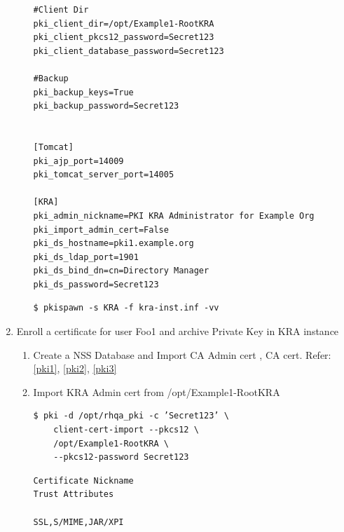 \documentclass[a4paper]{article}
\begin{document}
\begin{enumerate}[label*=\arabic*.]
\begin{enumerate}[label*=\arabic*.]
\begin{lstlisting}[style=configFile]
#Client Dir
pki_client_dir=/opt/Example1-RootKRA
pki_client_pkcs12_password=Secret123
pki_client_database_password=Secret123

#Backup
pki_backup_keys=True
pki_backup_password=Secret123


[Tomcat]
pki_ajp_port=14009
pki_tomcat_server_port=14005

[KRA]
pki_admin_nickname=PKI KRA Administrator for Example Org
pki_import_admin_cert=False
pki_ds_hostname=pki1.example.org
pki_ds_ldap_port=1901
pki_ds_bind_dn=cn=Directory Manager
pki_ds_password=Secret123
                \end{lstlisting}
                \begin{lstlisting}[style=bashInputStyle]
$ pkispawn -s KRA -f kra-inst.inf -vv   
                \end{lstlisting}
            \end{enumerate}
        \item \label{arch_privatekey} Enroll a certificate for user Foo1 and archive Private Key in KRA instance
            \begin{enumerate}[label*=\arabic*.]
                \item Create a NSS Database and Import CA Admin cert , CA cert. Refer:\ref{pki1}, \ref{pki2}, \ref{pki3}
                \item Import KRA Admin cert from /opt/Example1-RootKRA
                    \begin{lstlisting}[style=bashInputStyle]
$ pki -d /opt/rhqa_pki -c ’Secret123’ \
    client-cert-import --pkcs12 \
    /opt/Example1-RootKRA \
    --pkcs12-password Secret123
                    \end{lstlisting}
                    \begin{lstlisting}
Certificate Nickname                                         Trust Attributes
                                                             SSL,S/MIME,JAR/XPI


\end{lstlisting}
\end{enumerate}
\end{enumerate}
\end{document}

